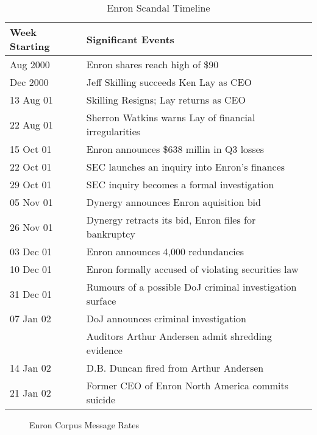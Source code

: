 \documentclass[a4paper]{article}
\begin{document}
\begin{table}
  \centering
  \begin{tabular}{ll}
  \toprule
  Week Starting & Significant Events \\
  \midrule
  Aug 2000 & Enron shares reach high of \$90 \\
  Dec 2000 & Jeff Skilling succeeds Ken Lay as CEO \\
  13 Aug 01 & Skilling Resigns; Lay returns as CEO \\
  22 Aug 01 & Sherron Watkins warns Lay of financial irregularities \\
  15 Oct 01 & Enron announces \$638 millin in Q3 losses \\
  22 Oct 01 & SEC launches an inquiry into Enron's finances \\
  29 Oct 01 & SEC inquiry becomes a formal investigation \\
  05 Nov 01 & Dynergy announces Enron aquisition bid \\
  26 Nov 01 & Dynergy retracts its bid, Enron files for bankruptcy \\
  03 Dec 01 & Enron announces 4,000 redundancies \\
  10 Dec 01 & Enron formally accused of violating securities law \\
  31 Dec 01 & Rumours of a possible DoJ criminal investigation surface \\
  07 Jan 02 & DoJ announces criminal investigation \\
            & Auditors Arthur Andersen admit shredding evidence \\
  14 Jan 02 & D.B. Duncan fired from Arthur Andersen \\
  21 Jan 02 & Former CEO of Enron North America commits suicide \\
  \bottomrule
  \end{tabular}
  \caption{Enron Scandal Timeline}
\end{table}

\begin{figure}
\centering

\caption{Enron Corpus Message Rates}
\label{fig:technique}
\end{figure}
\end{document}
